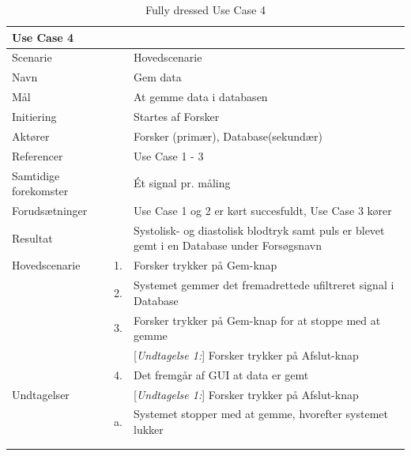 \begin{longtabu} to  %
    {\large \textbf{Use Case 4}} && \\
    \toprule
    Scenarie && Hovedscenarie\\
    Navn && Gem data\\
    Mål && At gemme data i databasen\\
    Initiering && Startes af Forsker\\
    Aktører && Forsker (primær), Database(sekundær)\\
    Referencer && Use Case 1 - 3 \\
    Samtidige forekomster  &&  Ét signal pr. måling\\
    Forudsætninger && Use Case 1 og 2 er kørt succesfuldt, Use Case 3 kører\\
    Resultat && Systolisk- og diastolisk blodtryk samt puls er blevet gemt i en Database under Forsøgsnavn\\ \midrule
    Hovedscenarie &    1. &		Forsker trykker på Gem-knap\\[-1ex] 
    &	2. & Systemet gemmer det fremadrettede ufiltreret signal i Database\\
                  &    3. &  Forsker trykker på Gem-knap for at stoppe med at gemme\\
    &	&			[\textit{Undtagelse 1:}] Forsker trykker på Afslut-knap\\
                    &    4. &   Det fremgår af GUI at data er gemt\\ \midrule	 	
 Undtagelser &    & [\textit{Undtagelse 1:}] Forsker trykker på Afslut-knap\\
 & a. 	&  Systemet stopper med at gemme, hvorefter systemet lukker\\  

 \\ \bottomrule
\caption{Fully dressed Use Case 4}
\label{UC4}
\end{longtabu}

